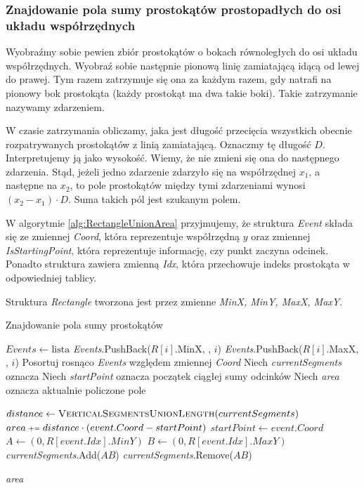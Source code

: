 \subsubsection{Znajdowanie pola sumy prostokątów prostopadłych do osi układu współrzędnych}
Wyobraźmy sobie pewien zbiór prostokątów o bokach równoległych do osi układu współrzędnych. Wyobraź sobie następnie pionową linię zamiatającą idącą od lewej do prawej. Tym
razem zatrzymuje się ona za każdym razem, gdy natrafi na pionowy bok prostokąta (każdy prostokąt ma dwa takie
boki). Takie zatrzymanie nazywamy zdarzeniem. 

W czasie zatrzymania obliczamy, jaka jest długość przecięcia wszystkich obecnie rozpatrywanych 
prostokątów z linią zamiatającą. Oznaczmy tę długość $D$. Interpretujemy ją jako wysokość. Wiemy, 
że nie zmieni się ona do następnego zdarzenia. Stąd, jeżeli jedno zdarzenie zdarzyło się na współrzędnej $x_1$,
a następne na $x_2$, to pole prostokątów między tymi zdarzeniami wynosi $(x_2-x_1)\cdot D$. Suma takich pól jest szukanym polem.

W algorytmie \ref{alg:RectangleUnionArea} przyjmujemy, że
struktura \textit{Event} składa się ze zmiennej \textit{Coord}, która reprezentuje
współrzędną $y$ oraz zmiennej \textit{IsStartingPoint}, która 
reprezentuje informację, czy punkt zaczyna odcinek. Ponadto 
struktura zawiera zmienną \textit{Idx}, która przechowuje
indeks prostokąta w odpowiedniej tablicy.

Struktura \textit{Rectangle} tworzona jest przez zmienne \textit{MinX, MinY, MaxX, MaxY}.

\begin{algorithm}[H]
	\caption{Znajdowanie pola sumy prostokątów}
	\begin{algorithmic}[1]
		\State $Events \gets \text{lista}$
		\State \textit{Events}.PushBack($R[i]$.MinX, \true, $i$)
		\State \textit{Events}.PushBack($R[i]$.MaxX, \false, $i$)
		\EndFor
		\State Posortuj rosnąco \textit{Events }względem zmiennej \textit{Coord}
		\State Niech \textit{currentSegments} oznacza %
		\State Niech \textit{startPoint} oznacza początek ciągłej sumy odcinków
		\State Niech \textit{area} oznacza aktualnie policzone pole
		
		\State $distance \gets \textsc{VerticalSegmentsUnionLength}(currentSegments)$
		\State $area \pleq distance \cdot (event.Coord - startPoint)$
		\EndIf
		\State $startPoint \gets event.Coord$
		\State $A \gets (0, R[event.Idx].MinY)$
		\State $B \gets (0, R[event.Idx].MaxY)$
		\State \textit{currentSegments}.Add($AB$)
		\Else
		\State \textit{currentSegments}.Remove($AB$)
		\EndIf
		\EndFor
		
		\State \Return \textit{area}
		\EndProcedure
	\end{algorithmic}
	\label{alg:RectangleUnionArea}
\end{algorithm}

